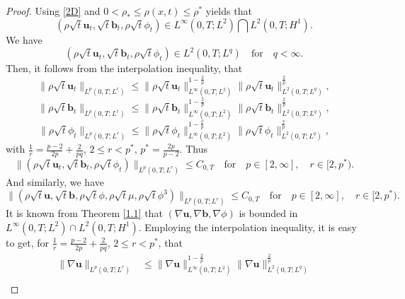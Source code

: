 \documentclass[11pt]{article}
\numberwithin{equation}{section}
\begin{document}
\begin{proof}
Using \eqref{2D} and $0<\rho_* \leq \rho(x, t) \leq \rho^*$  yields that
\begin{equation*}
(\rho\sqrt{t}\mathbf{u}_t, \sqrt{t}\mathbf{b}_t, \rho\sqrt{t}\phi_t) \in L^\infty(0, T; L^2)\bigcap L^2(0, T; H^1).
\end{equation*}
 We have
\begin{equation*}
(\rho\sqrt{t}\mathbf{u}_t, \sqrt{t}\mathbf{b}_t, \rho\sqrt{t}\phi_t) \in L^2(0, T; L^q) \quad \text{for} \quad q < \infty.
\end{equation*}
Then, it follows from the interpolation inequality, that
\begin{equation*}
\|\rho\sqrt{t}\mathbf{u}_t\|_{L^p(0,T;L^r)} \leq \|\rho\sqrt{t}\mathbf{u}_t\|_{L^\infty(0,T;L^2)}^{1 - \frac{2}{p}} \|\rho\sqrt{t}\mathbf{u}_t\|_{L^2(0,T;L^q)}^{\frac{2}{p}},
\end{equation*}
\begin{equation*}
\|\rho\sqrt{t}\mathbf{b}_t\|_{L^p(0,T;L^r)} \leq \|\rho\sqrt{t}\mathbf{b}_t\|_{L^\infty(0,T;L^2)}^{1 - \frac{2}{p}} \|\rho\sqrt{t}\mathbf{b}_t\|_{L^2(0,T;L^q)}^{\frac{2}{p}},
\end{equation*}
\begin{equation*}
\|\rho\sqrt{t}\phi_t\|_{L^p(0,T;L^r)} \leq \|\rho\sqrt{t}\phi_t\|_{L^\infty(0,T;L^2)}^{1 - \frac{2}{p}} \|\rho\sqrt{t}\phi_t\|_{L^2(0,T;L^q)}^{\frac{2}{p}},
\end{equation*}
with $\frac{1}{r} = \frac{p - 2}{2p} + \frac{2}{pq}$, $2 \leq r < p^*$, $p^*=\frac{2p}{p-2}$.
Thus
\begin{equation}
\|(\rho\sqrt{t}\mathbf{u}_t, \sqrt{t}\mathbf{b}_t, \rho\sqrt{t}\phi_t)\|_{L^p(0,T;L^r)} \leq C_{0,T} \quad \text{for} \quad p \in [2, \infty], \quad r \in [2, p^*).
\end{equation}
And similarly, we have
\begin{equation}
\|(\rho\sqrt{t}\mathbf{u}, \sqrt{t}\mathbf{b}, \rho\sqrt{t}\phi, \rho\sqrt{t}\mu, \rho\sqrt{t}\phi^3)\|_{L^p(0,T;L^r)} \leq C_{0,T} \quad \text{for} \quad p \in [2, \infty], \quad r \in [2, p^*).
\end{equation}
It is known from Theorem \ref{1.1} that $(\nabla \mathbf{u}, \nabla \mathbf{b}, \nabla \phi)$ is bounded in  $L^\infty(0, T; L^2) \cap L^2(0, T; H^1)$. Employing the interpolation inequality, it is easy to get,  for $\frac{1}{r} = \frac{p - 2}{2p} + \frac{2}{pq}$, $2 \leq r < p^*$, that
\begin{align*}
\|\nabla \mathbf{u}\|_{L^p(0,T;L^r)} &\le \|\nabla \mathbf{u}\|_{L^\infty(0,T;L^2)}^{1 - \frac{2}{p}} \|\nabla \mathbf{u}\|_{L^2(0,T;L^q)}^{\frac{2}{p}} \\

\end{align*}
\end{proof}
\end{document}
